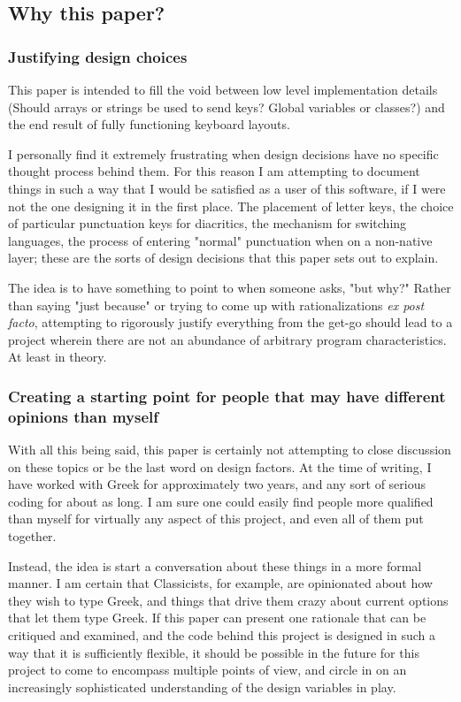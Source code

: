 \documentclass[11pt]{article}
\begin{document}
\subsection{Why this paper?}
\label{sec:org46be33e}

\subsubsection{Justifying design choices}
\label{sec:org960d52f}

This paper is intended to fill the void between low level implementation details (Should arrays or strings be used to send keys? Global variables or classes?) and the end result of fully functioning keyboard layouts.

I personally find it extremely frustrating when design decisions have no specific thought process behind them. For this reason I am attempting to document things in such a way that I would be satisfied as a user of this software, if I were not the one designing it in the first place. The placement of letter keys, the choice of particular punctuation keys for diacritics, the mechanism for switching languages, the process of entering "normal" punctuation when on a non-native layer; these are the sorts of design decisions that this paper sets out to explain.

The idea is to have something to point to when someone asks, "but why?" Rather than saying "just because" or trying to come up with rationalizations \emph{ex post facto}, attempting to rigorously justify everything from the get-go should lead to a project wherein there are not an abundance of arbitrary program characteristics. At least in theory.

\subsubsection{Creating a starting point for people that may have different opinions than myself}
\label{sec:org92fd38a}

With all this being said, this paper is certainly not attempting to close discussion on these topics or be the last word on design factors. At the time of writing, I have worked with Greek for approximately two years, and any sort of serious coding for about as long. I am sure one could easily find people more qualified than myself for virtually any aspect of this project, and even all of them put together.

Instead, the idea is start a conversation about these things in a more formal manner. I am certain that Classicists, for example, are opinionated about how they wish to type Greek, and things that drive them crazy about current options that let them type Greek. If this paper can present one rationale that can be critiqued and examined, and the code behind this project is designed in such a way that it is sufficiently flexible, it should be possible in the future for this project to come to encompass multiple points of view, and circle in on an increasingly sophisticated understanding of the design variables in play.
\end{document}
